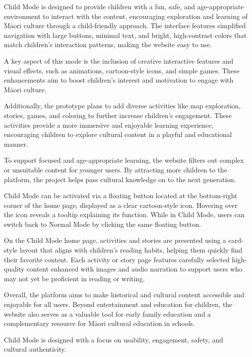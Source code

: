 Child Mode is designed to provide children with a fun, safe, and age-appropriate environment to interact with the content, encouraging exploration and learning of Māori culture through a child-friendly approach. The interface features simplified navigation with large buttons, minimal text, and bright, high-contrast colors that match children’s interaction patterns, making the website easy to use.

A key aspect of this mode is the inclusion of creative interactive features and visual effects, such as animations, cartoon-style icons, and simple games. These enhancements aim to boost children’s interest and motivation to engage with Māori culture.

Additionally, the prototype plans to add diverse activities like map exploration, stories, games, and coloring to further increase children’s engagement. These activities provide a more immersive and enjoyable learning experience, encouraging children to explore cultural content in a playful and educational manner.

To support focused and age-appropriate learning, the website filters out complex or unsuitable content for younger users. By attracting more children to the platform, the project helps pass cultural knowledge on to the next generation.

Child Mode can be activated via a floating button located at the bottom-right corner of the home page, displayed as a clear cartoon-style icon. Hovering over the icon reveals a tooltip explaining its function. While in Child Mode, users can switch back to Normal Mode by clicking the same floating button.

On the Child Mode home page, activities and stories are presented using a card-style layout that aligns with children’s reading habits, helping them quickly find their favorite content. Each activity or story page features carefully selected high-quality content enhanced with images and audio narration to support users who may not yet be proficient in reading or writing.

Overall, the platform aims to make historical and cultural content accessible and enjoyable for all users. Beyond entertainment and education for children, the website also serves as a valuable tool for early family education and a complementary resource for Māori cultural education in schools.

Child Mode is designed with a focus on usability, engagement, safety, and cultural authenticity.

